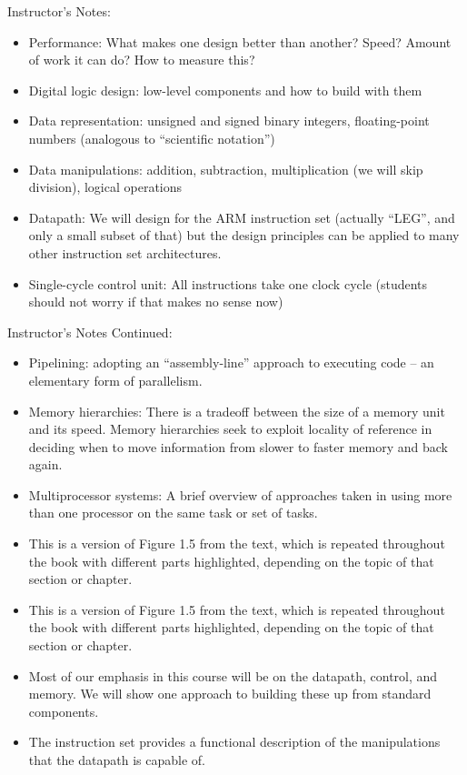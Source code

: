 \BNotes\ifnum{}
\begin{frame}[fragile]
Instructor's Notes:
\begin{itemize}
\item Performance: What makes one design better than another? Speed?
	Amount of work it can do? How to measure this?
\item Digital logic design: low-level components and how to build with them
\item Data representation: unsigned and signed binary integers,
	floating-point numbers (analogous to ``scientific notation'')
\item Data manipulations: addition, subtraction, multiplication (we
	will skip division), logical operations
      \item Datapath: We will design for the ARM instruction set (actually ``LEG'',
        and only a small subset of that) but the design principles can
	be applied to many other instruction set architectures.
\item Single-cycle control unit: All instructions take one clock cycle
	(students should not worry if that makes no sense now)
\end{itemize}
\end{frame}
\begin{frame}[fragile]
Instructor's Notes Continued:
\begin{itemize}
\item Pipelining: adopting an ``assembly-line'' approach to executing
	code -- an elementary form of parallelism.
\item Memory hierarchies: There is a tradeoff between the size of a
	memory unit and its speed. Memory hierarchies seek to exploit
	locality of reference in deciding when to move information
	from slower to faster memory and back again.
\item Multiprocessor systems: A brief overview of approaches taken in
	using more than one processor on the same task or set of tasks.
 \item This is a version of Figure 1.5 from the text, which is
repeated throughout the book with different parts highlighted,
depending on the topic of that section or chapter.
\item This is a version of Figure 1.5 from the text, which is
repeated throughout the book with different parts highlighted,
depending on the topic of that section or chapter.

\item Most of our emphasis in this course will be on the datapath, control,
and memory. We will show one approach to building these up from
standard components.

\item The instruction set provides a functional description of the
manipulations that the datapath is capable of.

\end{itemize}

\end{frame}
\fi\ENotes

